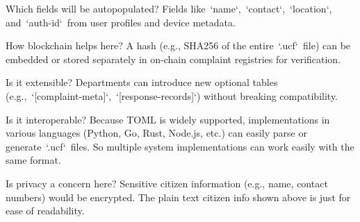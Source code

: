 \documentclass[12pt]{spec}
\begin{document}
\begin{specpara}{Which fields will be autopopulated?}
Fields like `name`, `contact`, `location`, and `auth-id` from user profiles and
device metadata.
\end{specpara}

\begin{specpara}{How blockchain helps here?}
A hash (e.g., SHA256 of the entire `.ucf` file) can be embedded or stored
separately in on-chain complaint registries for verification.
\end{specpara}

\begin{specpara}{Is it extensible?}
Departments can introduce new optional tables
(e.g., `[complaint-meta]`, `[response-records]`) without breaking
compatibility.
\end{specpara}

\begin{specpara}{Is it interoperable?}
Because TOML is widely supported, implementations in various languages (Python,
Go, Rust, Node.js, etc.) can easily parse or generate `.ucf` files. So
multiple system implementations can work easily with the same format.
\end{specpara}

\begin{specpara}{Is privacy a concern here?}
Sensitive citizen information (e.g., name, contact numbers) would be encrypted.
The plain text citizen info shown above is just for ease of readability.
\end{specpara}
\end{document}
